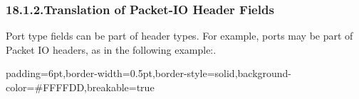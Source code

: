 \documentclass[11pt]{article}
\begin{document}
{%
\subsubsection{18.1.2.\hspace*{0.5em}Translation of Packet-IO Header Fields}\label{sec-translation-of-packet-io-header-fields}%

\noindent{}Port type fields can be part of header types. For example, ports may be part of
Packet IO headers, as in the following example:.%

\begin{mdbmargintb}{6pt}{6pt}%
\begin{mdblock}{padding=6pt,border-width=0.5pt,border-style=solid,background-color=\#FFFFDD,breakable=true}%
\begin{mdpre}%
\end{mdpre}%
\end{mdblock}%
\end{mdbmargintb}%

}
\end{document}
